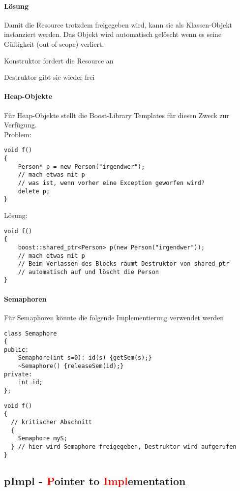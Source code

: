 \paragraph{Lösung}
Damit die Resource trotzdem freigegeben wird, kann sie als Klassen-Objekt instanziert werden. Das Objekt wird automatisch gelöscht wenn es seine Gültigkeit (out-of-scope) verliert.
\begin{compactitem}
	\item Konstruktor fordert die Resource an
	\item Destruktor gibt sie wieder frei
\end{compactitem}


\paragraph{Heap-Objekte}
Für Heap-Objekte stellt die Boost-Library Templates für diesen Zweck zur Verfügung.\\
Problem:
\begin{lstlisting}
void f()
{
	Person* p = new Person("irgendwer");
	// mach etwas mit p
	// was ist, wenn vorher eine Exception geworfen wird?
	delete p;
}
\end{lstlisting}

Lösung:
\begin{lstlisting}
void f()
{
	boost::shared_ptr<Person> p(new Person("irgendwer"));
	// mach etwas mit p
	// Beim Verlassen des Blocks räumt Destruktor von shared_ptr
	// automatisch auf und löscht die Person
}
\end{lstlisting}


\paragraph{Semaphoren} Für Semaphoren könnte die folgende Implementierung verwendet werden


\begin{lstlisting}
class Semaphore
{
public:
	Semaphore(int s=0): id(s) {getSem(s);}
	~Semaphore() {releaseSem(id);}
private:
	int id;
};
\end{lstlisting}
\begin{lstlisting}
void f()
{
  // kritischer Abschnitt
  {
    Semaphore myS; 
  } // hier wird Semaphore freigegeben, Destruktor wird aufgerufen
}
\end{lstlisting}


\subsection[pImpl]{pImpl - \textcolor{red}{P}ointer to \textcolor{red}{Impl}ementation}
\label{sec:pimpl}

